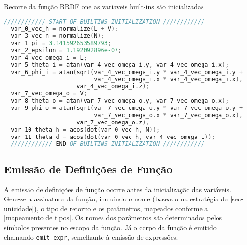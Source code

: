 \begin{codigo}[htb]
    \caption{\small Recorte da função BRDF one as variaveis built-ins são inicializadas }
    \label{cod-builtins-emitted}
\begin{lstlisting}[language=C, frame=none, inputencoding=utf8]
  //////////// START OF BUILTINS INITIALIZATION ////////////
  var_0_vec_h = normalize(L + V);
  var_3_vec_n = normalize(N);
  var_1_pi = 3.141592653589793;
  var_2_epsilon = 1.192092896e-07;
  var_4_vec_omega_i = L;
  var_5_theta_i = atan(var_4_vec_omega_i.y, var_4_vec_omega_i.x);
  var_6_phi_i = atan(sqrt(var_4_vec_omega_i.y * var_4_vec_omega_i.y +
                          var_4_vec_omega_i.x * var_4_vec_omega_i.x),
                     var_4_vec_omega_i.z);
  var_7_vec_omega_o = V;
  var_8_theta_o = atan(var_7_vec_omega_o.y, var_7_vec_omega_o.x);
  var_9_phi_o = atan(sqrt(var_7_vec_omega_o.y * var_7_vec_omega_o.y +
                          var_7_vec_omega_o.x * var_7_vec_omega_o.x),
                     var_7_vec_omega_o.z);
  var_10_theta_h = acos(dot(var_0_vec_h, N));
  var_11_theta_d = acos(dot(var_0_vec_h, var_4_vec_omega_i));
  //////////// END OF BUILTINS INITIALIZATION ////////////
\end{lstlisting}
\end{codigo}




%
%

\subsection{Emissão de Definições de Função}

A emissão de definições de função ocorre antes da inicialização das variáveis. Gera-se a assinatura da função, incluindo o nome (baseado na estratégia da \autoref{sec-unicidade}), o tipo de retorno e os parâmetros, mapeados conforme a \autoref{mapeamento de tipos}.  Os nomes dos parâmetros são determinados pelos símbolos presentes no escopo da função. Já o corpo da função é emitido chamando \verb|emit_expr|, semelhante à emissão de expressões.

